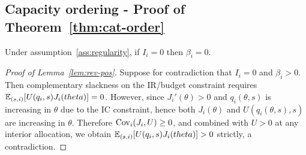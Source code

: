\documentclass{class}
\begin{document}
\subsection{Capacity ordering - Proof of Theorem~\ref{thm:cat-order}}\label{proof:cat-order}



\begin{lemma}\label{lem:rev-pos}
Under assumption~\ref{ass:regularity}, if $I_i=0$ then $\beta_i=0$.
\end{lemma}
\begin{proof}[Proof of Lemma~\ref{lem:rev-pos}]
Suppose for contradiction that $I_i=0$ and $\beta_i>0$. Then complementary slackness on the IR/budget constraint requires $\mathbb{E}_{(s,i)}[U(q_i,s)J_i(theta)]=0$. However, since $J_i'(\theta)>0$ and $q_i(\theta,s)$ is increasing in $\theta$ due to the IC constraint, hence both $J_i(\theta)$ and $U(q_i(\theta,s),s)$ are increasing in $\theta$. Therefore $\mathrm{Cov}_{i}(J_i,U)\ge 0$, and combined with $U>0$ at any interior allocation, we obtain $\mathbb{E}_{(s,i)}[U(q_i,s)J_i(theta)]>0$ strictly, a contradiction.
\end{proof}
\end{document}
